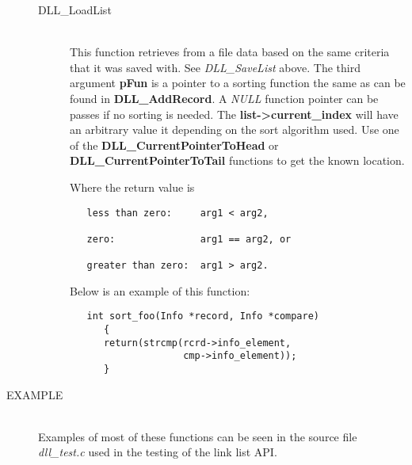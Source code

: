 \documentclass[10pt,letterpaper,titlepage]{article}
\begin{document}
\begin{description}
\begin{description}
\item[DLL\_LoadList]\quad\\
 This function retrieves from a file data based on the same criteria that it was saved with.  See \emph{DLL\_SaveList} above.  The third argument \textbf{pFun} is a pointer to a sorting function the same as can be found in \textbf{DLL\_AddRecord}.  A \emph{NULL} function pointer can be passes if no sorting is needed.  The \textbf{list->current\_index} will have an arbitrary value it depending on the sort algorithm used. Use one of the \textbf{DLL\_CurrentPointerToHead} or \textbf{DLL\_CurrentPointerToTail} functions to get the known location.
\vspace{8pt}

 Where the return value is
\begin{verbatim}
   less than zero:     arg1 < arg2,

   zero:               arg1 == arg2, or

   greater than zero:  arg1 > arg2.
\end{verbatim}

 Below is an example of this function:

\begin{verbatim}
   int sort_foo(Info *record, Info *compare)
      {
      return(strcmp(rcrd->info_element,
                    cmp->info_element));
      }
\end{verbatim}

 
\end{description}

\item[EXAMPLE]\quad\\
Examples of most of these functions can be seen in the source file \emph{dll\_test.c} used in the testing of the link list API.
\end{description}
\end{document}
